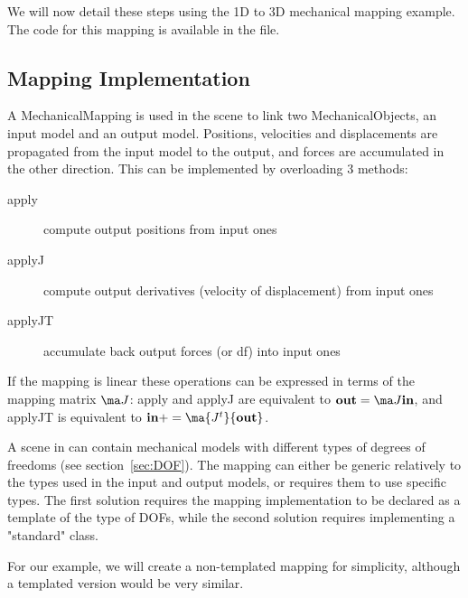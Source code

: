 We will now detail these steps using the 1D to 3D mechanical mapping example.
The code for this mapping is available in the  file.

\subsection{Mapping Implementation}

A MechanicalMapping is used in the scene to link two MechanicalObjects, an input model and an output model. Positions, velocities and displacements are propagated from the input model to the output, and forces are accumulated in the other direction. This can be implemented by overloading 3 methods:

\begin{description}
\item[apply] compute output positions from input ones
\item[applyJ] compute output derivatives (velocity of displacement) from input ones
\item[applyJT] accumulate back output forces (or df) into input ones
\end{description}

If the mapping is linear these operations can be expressed in terms of the mapping matrix $\ma J$: apply and applyJ are equivalent to ${\mathbf {out}} = \ma J {\mathbf {in}}$, and applyJT is equivalent to $ {\mathbf {in}} += \ma {J^{t}} {\mathbf {out}} $.

A scene in \sofa{} can contain mechanical models with different types of degrees of freedoms (see section~\ref{sec:DOF}). The mapping can either be generic relatively to the types used in the input and output models, or requires them to use specific types. The first solution requires the mapping implementation to be declared as a template of the type of DOFs, while the second solution requires implementing a "standard" class.

For our example, we will create a non-templated mapping for simplicity, although a templated version would be very similar.

